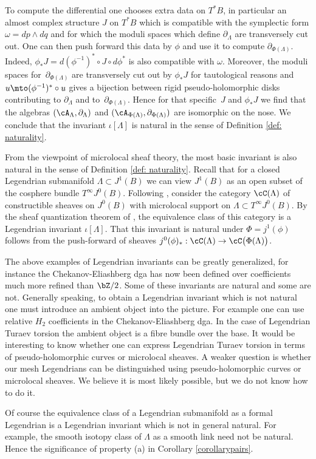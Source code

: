 To compute the differential one chooses extra data on $T^*B$, in particular an almost complex structure $J$ on $T^*B$ which is compatible with the symplectic form $\omega=dp \wedge dq$ and for which the moduli spaces which define $\partial_\Lambda$ are transversely cut out. One can then push forward this data by $\phi$ and use it to compute $\partial_{\Phi(\Lambda)}$. Indeed, $\phi_* J=d(\phi^{-1})^* \circ J \circ d \phi^*$ is also compatible with $\omega$. Moreover, the moduli spaces for~$\partial_{\Phi(\Lambda)}$ are transversely cut out by $\phi_*J$ for tautological reasons and $u \mto (\phi^{-1})^* \circ u$ gives a bijection between rigid pseudo-holomorphic disks contributing to $\partial_\Lambda$ and to~$\partial_{\Phi(\Lambda)}$. Hence for that specific~$J$ and $\phi_*J$ we find that the algebras $(\cA_\Lambda, \partial_\Lambda)$ and $(\cA_{\Phi(\Lambda)}, \partial_{\Phi(\Lambda)})$ are isomorphic on the nose. We conclude that the invariant $\iota[\Lambda]$ is natural in the sense of Definition \ref{def: naturality}.

From the viewpoint of microlocal sheaf theory, the most basic invariant is also natural in the sense of Definition \ref{def: naturality}. Recall that for a closed Legendrian submanifold $\Lambda \subset J^1(B)$ we can view $J^1(B)$ as an open subset of the cosphere bundle $T^\infty J^0(B)$. Following \cite{STZ17}, consider the category $\cC(\Lambda)$ of constructible sheaves on $J^0(B)$ with microlocal support on $\Lambda \subset T^\infty J^0(B)$. By the sheaf quantization theorem of \cite{GKS12}, the equivalence class of this category is a Legendrian invariant $\iota[\Lambda]$. That this invariant is natural under $\Phi=j^1(\phi)$ follows from the push-forward of sheaves $j^0(\phi)_*: \cC(\Lambda) \to \cC\big(\Phi(\Lambda)\big)$.

The above examples of Legendrian invariants can be greatly generalized, for instance the Chekanov-Eliashberg dga has now been defined over coefficients much more refined than $\bZ/2$. Some of these invariants are natural and some are not. Generally speaking, to obtain a Legendrian invariant which is not natural one must introduce an ambient object into the picture. For example one can use relative $H_2$ coefficients in the Chekanov-Eliashberg dga. In the case of Legendrian Turaev torsion the ambient object is a fibre bundle over the base. It would be interesting to know whether one can express Legendrian Turaev torsion in terms of pseudo-holomorphic curves or microlocal sheaves. A weaker question is whether our mesh Legendrians can be distinguished using pseudo-holomorphic curves or microlocal sheaves. We believe it is most likely possible, but we do not know how to do it.
\begin{remark}
Of course the equivalence class of a Legendrian submanifold as a formal Legendrian is a Legendrian invariant which is not in general natural. For example, the smooth isotopy class of $\Lambda$ as a smooth link need not be natural. Hence the significance of property (a) in Corollary \ref{corollarypairs}.
\end{remark}

